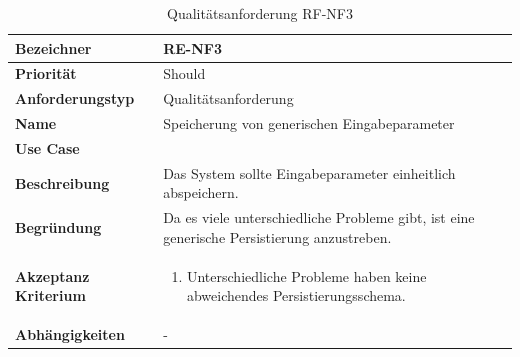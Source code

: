 \begin{table}[ht]
\centering
  \begin{tabular}{ l | p{8cm} }
	\hline
	\rowcolor{gray}
	\textbf{Bezeichner}&	\textbf{RE-NF3}\\ \hline
	\textbf{Priorität} 		&	Should\\ \hline
	\textbf{Anforderungstyp}	&	Qualitätsanforderung\\ \hline
	\textbf{Name} 			&	Speicherung von generischen Eingabeparameter\\ \hline
	\textbf{Use Case} 		&	\nameref{table:use_case_1}\\ \hline
	\textbf{Beschreibung} 	&	Das System sollte Eingabeparameter einheitlich abspeichern.\\ \hline
	\textbf{Begründung} 		&	Da es viele unterschiedliche Probleme gibt, ist eine generische Persistierung anzustreben.\\ \hline
	\textbf{Akzeptanz Kriterium}	&	\begin{enumerate}
					\item Unterschiedliche Probleme haben keine abweichendes Persistierungsschema.
					\end{enumerate}
					\\ \hline
	\textbf{Abhängigkeiten} 	&	-\\ \hline
  \end{tabular}
   \caption{Qualitätsanforderung RF-NF3}\label{table:req_nf_3}
\end{table}

\newpage
